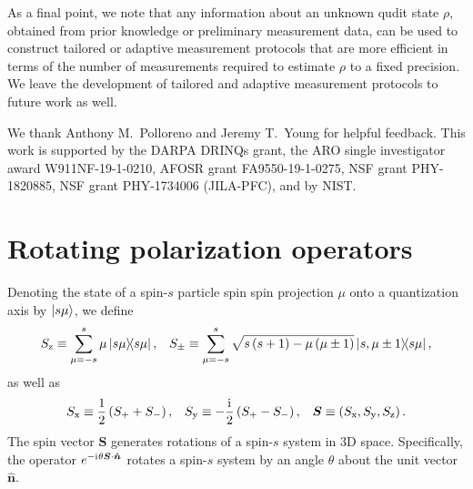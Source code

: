 \documentclass[nofootinbib,twocolumn]{revtex4-1}
\newcommand{\f}[2]{\dfrac{#1}{#2}} %
\newcommand{\p}[1]{\left(#1\right)} %
\newcommand{\uv}[1]{\bm{\hat{#1}}} %
\renewcommand{\i}{\mathrm{i}\mkern1mu} %
\newcommand{\x}{\text{x}}
\newcommand{\y}{\text{y}}
\newcommand{\z}{\text{z}}
\begin{document}
As a final point, we note that any information about an unknown qudit state $\rho$, obtained from prior knowledge or preliminary measurement data, can be used to construct tailored or adaptive measurement protocols \cite{huszar2012adaptive, ferrie2014selfguided, granade2016practical, pereira2018adaptive} that are more efficient in terms of the number of measurements required to estimate $\rho$ to a fixed precision.
We leave the development of tailored and adaptive measurement protocols to future work as well.

\begin{acknowledgments}
We thank Anthony M.~Polloreno and Jeremy T.~Young for helpful feedback.
This work is supported  by the DARPA DRINQs grant, the ARO single investigator award W911NF-19-1-0210, AFOSR grant FA9550-19-1-0275, NSF grant PHY-1820885, NSF grant PHY-1734006 (JILA-PFC), and by NIST.
\end{acknowledgments}


\onecolumngrid
\appendix

\section{Rotating polarization operators}
\label{sec:rotations}

Denoting the state of a spin-$s$ particle spin spin projection $\mu$ onto a quantization axis by $\ket{s\mu}$, we define
\begin{align}
  S_\z \equiv \sum_{\mu=-s}^s \mu \op{s\mu},
  &&
  S_\pm \equiv \sum_{\mu=-s}^s
  \sqrt{s\p{s+1}-\mu\p{\mu\pm1}} \op{s,\mu\pm1}{s\mu},
  \label{eq:spin_ops}
\end{align}
as well as
\begin{align}
  S_\x \equiv \f12\p{S_+ + S_-},
  &&
  S_\y \equiv -\f\i2\p{S_+-S_-},
  &&
  \bm S \equiv \p{S_\x,S_\y,S_\z}.
\end{align}
The spin vector $\bm S$ generates rotations of a spin-$s$ system in 3D space.
Specifically, the operator $e^{-\i\theta\bm S\cdot\uv n}$ rotates a spin-$s$ system by an angle $\theta$ about the unit vector $\uv n$.
\end{document}
